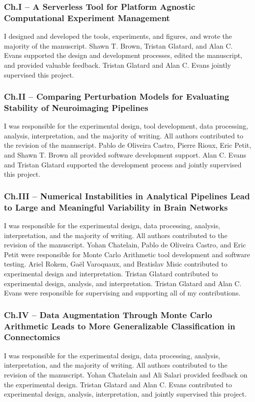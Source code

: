 \subsubsection*{Ch.I – A Serverless Tool for Platform Agnostic Computational Experiment Management}
I designed and developed the tools, experiments, and figures, and wrote the majority of the manuscript. Shawn T. Brown,
Tristan Glatard, and Alan C. Evans supported the design and development processes, edited the manuscript, and provided
valuable feedback. Tristan Glatard and Alan C. Evans jointly supervised this project.

\subsubsection*{Ch.II – Comparing Perturbation Models for Evaluating Stability of Neuroimaging Pipelines}
I was responsible for the experimental design, tool development, data processing, analysis, interpretation, and the
majority of writing. All authors contributed to the revision of the manuscript. Pablo de Oliveira Castro, Pierre Rioux,
Eric Petit, and Shawn T. Brown all provided software development support. Alan C. Evans and Tristan Glatard supported
the development process and jointly supervised this project.

\subsubsection*{Ch.III – Numerical Instabilities in Analytical Pipelines Lead to Large and Meaningful Variability in Brain
Networks}
I was responsible for the experimental design, data processing, analysis, interpretation, and the majority of writing.
All authors contributed to the revision of the manuscript. Yohan Chatelain, Pablo de Oliveira Castro, and Eric Petit
were responsible for Monte Carlo Arithmetic tool development and software testing. Ariel Rokem, Gaël Varoquaux, and
Bratislav Misic contributed to experimental design and interpretation. Tristan Glatard contributed to experimental
design, analysis, and interpretation. Tristan Glatard and Alan C. Evans were responsible for supervising and supporting
all of my contributions.

\subsubsection*{Ch.IV – Data Augmentation Through Monte Carlo Arithmetic Leads to More Generalizable Classification in
Connectomics}
I was responsible for the experimental design, data processing, analysis, interpretation, and the majority of writing.
All authors contributed to the revision of the manuscript. Yohan Chatelain and Ali Salari provided feedback on the
experimental design. Tristan Glatard and Alan C. Evans contributed to experimental design, analysis, interpretation,
and jointly supervised this project.

